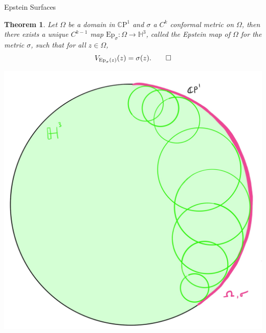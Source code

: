 \documentclass[professionalfont]{beamer}
\newcommand{\CP}{\mathbb{C}\mathrm{P}}
\renewcommand{\H}{\mathbb{H}}
\newtheorem{thm}{Theorem}[section]
\begin{document}
\begin{frame}{Epstein Surfaces}


\begin{thm}
Let $\Omega$ be a domain in $\CP^1$  and $\sigma$ a $C^k$ conformal metric on $\Omega$, then there exists a unique $C^{k-1}$ map $\mathrm{Ep}_\sigma : \Omega \to \H^3$, called the Epstein map of $\Omega$ for the metric $\sigma$, such that for all $z \in \Omega$,
\[
V_{\mathrm{Ep}_\sigma(z)}(z) = \sigma(z). \qed
\]
\end{thm}


\centering\includegraphics[scale=0.06]{Epstein-2.jpg}

\end{frame}


\end{document}

